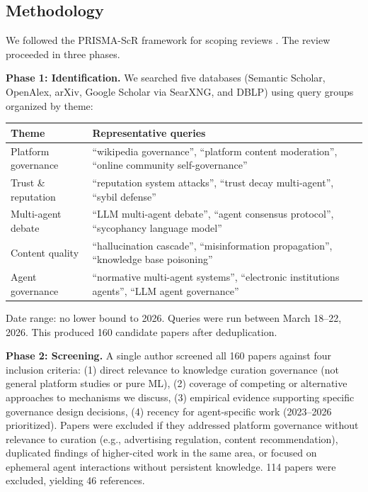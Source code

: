 \documentclass[11pt]{article}
\begin{document}
\subsection{Methodology}

We followed the PRISMA-ScR framework for scoping reviews \cite{tricco2018}. The review proceeded in three phases.

\textbf{Phase 1: Identification.} We searched five databases (Semantic Scholar, OpenAlex, arXiv, Google Scholar via SearXNG, and DBLP) using query groups organized by theme:

\begin{table}[htbp]
\centering
\small
\begin{tabular}{p{3.5cm} p{9cm}}
\toprule
\textbf{Theme} & \textbf{Representative queries} \\
\midrule
Platform governance & ``wikipedia governance'', ``platform content moderation'', ``online community self-governance'' \\
Trust \& reputation & ``reputation system attacks'', ``trust decay multi-agent'', ``sybil defense'' \\
Multi-agent debate & ``LLM multi-agent debate'', ``agent consensus protocol'', ``sycophancy language model'' \\
Content quality & ``hallucination cascade'', ``misinformation propagation'', ``knowledge base poisoning'' \\
Agent governance & ``normative multi-agent systems'', ``electronic institutions agents'', ``LLM agent governance'' \\
\bottomrule
\end{tabular}
\end{table}

Date range: no lower bound to 2026. Queries were run between March 18--22, 2026. This produced 160 candidate papers after deduplication.

\textbf{Phase 2: Screening.} A single author screened all 160 papers against four inclusion criteria: (1) direct relevance to knowledge curation governance (not general platform studies or pure ML), (2) coverage of competing or alternative approaches to mechanisms we discuss, (3) empirical evidence supporting specific governance design decisions, (4) recency for agent-specific work (2023--2026 prioritized). Papers were excluded if they addressed platform governance without relevance to curation (e.g., advertising regulation, content recommendation), duplicated findings of higher-cited work in the same area, or focused on ephemeral agent interactions without persistent knowledge. 114 papers were excluded, yielding 46 references.
\end{document}
